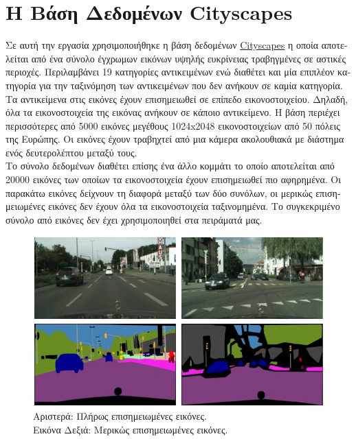 \section{\textgreek{Η Βάση Δεδομένων} Cityscapes }
\textgreek{Σε αυτή την εργασία χρησιμοποιήθηκε η βάση δεδομένων} \href{https://www.cityscapes-dataset.com/} {Cityscapes} \cite{Cityscapes} \textgreek{η οποία αποτελείται από ένα σύνολο έγχρωμων εικόνων υψηλής ευκρίνειας τραβηγμένες σε αστικές περιοχές. Περιλαμβάνει 19 κατηγορίες αντικειμένων ενώ διαθέτει και μία επιπλέον κατηγορία για την ταξινόμηση των αντικειμένων που δεν ανήκουν σε καμία κατηγορία. Τα αντικείμενα στις εικόνες έχουν επισημειωθεί σε επίπεδο εικονοστοιχείου. Δηλαδή, όλα τα εικονοστοιχεία της εικόνας ανήκουν σε κάποιο αντικείμενο. Η βάση περιέχει περισσότερες από 5000 εικόνες μεγέθους 1024}x\textgreek{2048 εικονοστοιχείων από 50 πόλεις της Ευρώπης. Οι εικόνες έχουν τραβηχτεί από μια κάμερα ακολουθιακά με διάστημα ενός δευτερολέπτου μεταξύ τους.}
\\[1cm]
\textgreek{Το σύνολο δεδομένων διαθέτει επίσης ένα άλλο κομμάτι το οποίο αποτελείται από 20000 εικόνες των οποίων τα εικονοστοιχεία έχουν επισημειωθεί πιο αφηρημένα. Οι παρακάτω εικόνες δείχνουν τη διαφορά μεταξύ των δύο συνόλων, οι μερικώς επισημειωμένες εικόνες δεν έχουν όλα τα εικονοστοιχεία ταξινομημένα. Το συγκεκριμένο σύνολο από εικόνες δεν έχει χρησιμοποιηθεί στα πειράματά μας.}

\begin{figure}[h!]
 \centering
 \includegraphics[scale=0.6]{Images/dataset.jpg}
 \caption[\textgreek{Παράδειγμα Εικόνων Βάσης}]{\textgreek{Αριστερά: Πλήρως επισημειωμένες εικόνες.
 \\ Εικόνα Δεξιά: Μερικώς επισημειωμένες εικόνες.}}
\end{figure}


